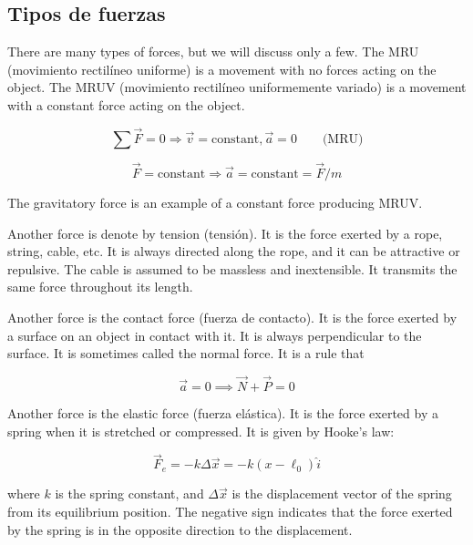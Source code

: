 \documentclass[12pt]{article}
\theoremstyle{definition}
\begin{document}
\subsection{Tipos de fuerzas}

There are many types of forces, but we will discuss only a few. The MRU
(movimiento rectilíneo uniforme) is a movement with no forces acting on the
object. The MRUV (movimiento rectilíneo uniformemente variado) is a movement
with a constant force acting on the object. 

\begin{equation*}
    \sum \vec{F} = 0 \Rightarrow \vec{v} = \text{constant}, \vec{a} = 0 \qquad \text{(MRU)}
\end{equation*}

\begin{equation*}
    \vec{F} = \text{constant} \Rightarrow \vec{a} = \text{constant} = \vec{F}/m
\end{equation*}

The gravitatory force is an example of a constant force producing MRUV. 

Another force is denote by tension (tensión). It is the force exerted by a rope,
string, cable, etc. It is always directed along the rope, and it can be
attractive or repulsive. The cable is assumed to be massless and inextensible.
It transmits the same force throughout its length.

Another force is the contact force (fuerza de contacto). It is the force exerted
by a surface on an object in contact with it. It is always perpendicular to the
surface. It is sometimes called the normal force. It is a rule that 

\begin{equation*}
    \vec{a} = 0 \implies \vec{N} + \vec{P} = 0
\end{equation*}

Another force is the elastic force (fuerza elástica). It is the force
exerted by a spring when it is stretched or compressed. It is given by Hooke's
law: 

\begin{equation*}
    \vec{F}_e = - k \Delta \vec{x} = -k (x - \ell_0)\hat{i}
\end{equation*}

where $k$ is the spring constant, and $\Delta \vec{x}$ is the displacement
vector of the spring from its equilibrium position. The negative sign indicates
that the force exerted by the spring is in the opposite direction to the
displacement. 
\end{document}
